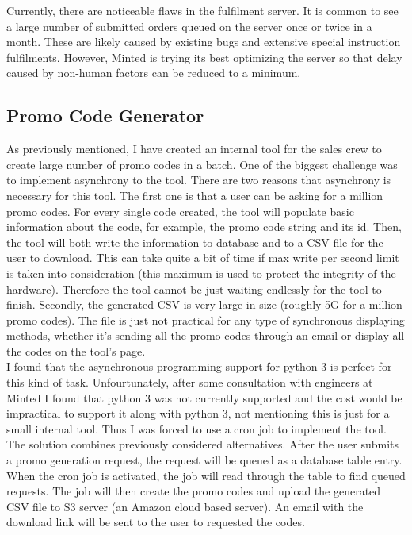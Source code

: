 \documentclass[12pt]{article}
\begin{document}
Currently, there are noticeable flaws in the fulfilment server. It is common to see a large number of submitted orders queued on the server once or twice in a month. These are likely caused by existing bugs and extensive special instruction fulfilments. However, Minted is trying its best optimizing the server so that delay caused by non-human factors can be reduced to a minimum.\\


\subsection{Promo Code Generator}
As previously mentioned, I have created an internal tool for the sales crew to create large number of promo codes in a batch. One of the biggest challenge was to implement asynchrony to the tool. There are two reasons that asynchrony is necessary for this tool. The first one is that a user can be asking for a million promo codes. For every single code created, the tool will populate basic information about the code, for example, the promo code string and its id. Then, the tool will both write the information to database and to a CSV file for the user to download. This can take quite a bit of time if max write per second limit is taken into consideration (this maximum is used to protect the integrity of the hardware). Therefore the tool cannot be just waiting endlessly for the tool to finish. Secondly, the generated CSV is very large in size (roughly 5G for a million promo codes). The file is just not practical for any type of synchronous displaying methods, whether it's sending all the promo codes through an email or display all the codes on the tool's page.\\

I found that the asynchronous programming support for python 3 is perfect for this kind of task. Unfourtunately, after some consultation with engineers at Minted I found that python 3 was not currently supported and the cost would be impractical to support it along with python 3, not mentioning this is just for a small internal tool. Thus I was forced to use a cron job to implement the tool. The solution combines previously considered alternatives. After the user submits a promo generation request, the request will be queued as a database table entry. When the cron job is activated, the job will read through the table to find queued requests. The job will then create the promo codes and upload the generated CSV file to S3 server (an Amazon cloud based server). An email with the download link will be sent to the user to requested the codes.\\
\end{document}
